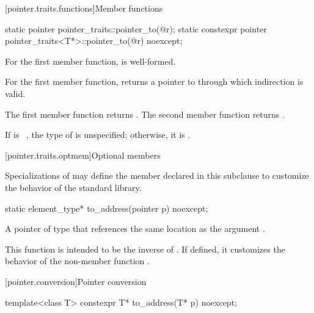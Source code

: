 [pointer.traits.functions]{Member functions}

%
\begin{itemdecl}
static pointer pointer_traits::pointer_to(@\seebelow@ r);
static constexpr pointer pointer_traits<T*>::pointer_to(@\seebelow@ r) noexcept;
\end{itemdecl}

\begin{itemdescr}
\pnum
\mandates
For the first member function,
 is well-formed.

\pnum
\expects
For the first member function,
 returns a pointer to 
through which indirection is valid.

\pnum
\returns
The first member function returns .
The second member function returns .

\pnum
\remarks
If  is \cv{}~, the type of
 is unspecified; otherwise, it is .
\end{itemdescr}

[pointer.traits.optmem]{Optional members}

\pnum
Specializations of  may define the member declared
in this subclause to customize the behavior of the standard library.

%
\begin{itemdecl}
static element_type* to_address(pointer p) noexcept;
\end{itemdecl}

\begin{itemdescr}
\pnum
\returns
A pointer of type  that references
the same location as the argument .

\pnum
\begin{note}
This function is intended to be the inverse of .
If defined, it customizes the behavior of
the non-member function
.
\end{note}
\end{itemdescr}

[pointer.conversion]{Pointer conversion}

%
\begin{itemdecl}
template<class T> constexpr T* to_address(T* p) noexcept;
\end{itemdecl}


